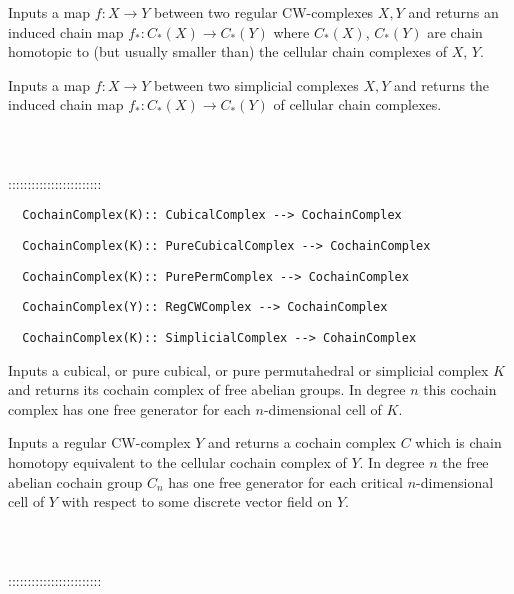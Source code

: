 \documentclass[a4paper,11pt]{report}
\begin{document}
{ Inputs a map $f\colon X \rightarrow Y$ between two regular CW-complexes $X,Y$ and returns an induced chain map $f_\ast\colon C_\ast(X) \rightarrow C_\ast(Y)$ where $C_\ast(X)$, $C_\ast(Y)$ are chain homotopic to (but usually smaller than) the cellular chain complexes
of $X$, $Y$. 

 Inputs a map $f\colon X \rightarrow Y$ between two simplicial complexes $X,Y$ and returns the induced chain map $f_\ast\colon C_\ast(X) \rightarrow C_\ast(Y)$ of cellular chain complexes. \\
 \\
 \\
 \\
 ::::::::::::::::::::::::\\
 
\begin{verbatim}  CochainComplex(K):: CubicalComplex --> CochainComplex
\end{verbatim}
 
\begin{verbatim}  CochainComplex(K):: PureCubicalComplex --> CochainComplex
\end{verbatim}
 
\begin{verbatim}  CochainComplex(K):: PurePermComplex --> CochainComplex
\end{verbatim}
 
\begin{verbatim}  CochainComplex(Y):: RegCWComplex --> CochainComplex
\end{verbatim}
 
\begin{verbatim}  CochainComplex(K):: SimplicialComplex --> CohainComplex
\end{verbatim}


 

 Inputs a cubical, or pure cubical, or pure permutahedral or simplicial complex $K$ and returns its cochain complex of free abelian groups. In degree $n$ this cochain complex has one free generator for each $n$-dimensional cell of $K$. 

 Inputs a regular CW-complex $Y$ and returns a cochain complex $C$ which is chain homotopy equivalent to the cellular cochain complex of $Y$. In degree $n$ the free abelian cochain group $C_n$ has one free generator for each critical $n$-dimensional cell of $Y$ with respect to some discrete vector field on $Y$. \\
 \\
 \\
 \\
 ::::::::::::::::::::::::\\
 
}
\end{document}
